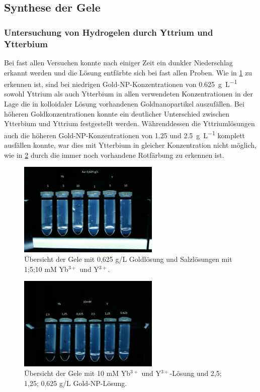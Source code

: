 	
	
	

\subsection{Synthese der Gele}
	
	\subsubsection{Untersuchung von Hydrogelen durch Yttrium und Ytterbium}
	
		Bei fast allen Versuchen konnte nach einiger Zeit ein dunkler Niederschlag erkannt werden und die Lösung entfärbte sich bei fast allen Proben.
		Wie in \cref{fig:0625Au-Gele} zu erkennen ist, sind bei niedrigen Gold-NP-Konzentrationen von \SI{0,625}{\gram\per\liter} sowohl Yttrium als auch Ytterbium in allen verwendeten Konzentrationen in der Lage die in kolloidaler Lösung vorhandenen Goldnanopartikel auszufällen.
		Bei höheren Goldkonzentrationen konnte ein deutlicher Unterschied zwischen Ytterbium und Yttrium festgestellt werden. 
		Währenddessen die Yttriumlösungen auch die höheren Gold-NP-Konzentrationen von \num{1,25} und \SI{2,5}{\gram\per\liter} komplett ausfällen konnte, war dies mit Ytterbium in gleicher Konzentration nicht möglich, wie in \cref{fig:1Y-Yb-Gele} durch die immer noch vorhandene Rotfärbung zu erkennen ist.
		
		\begin{figure}[htbp]
			\centering
			\includegraphics[width=0.6\textwidth]{Bilder/0625Au-Gele} 	
			\caption{Übersicht der Gele mit 0,625 g/L Goldlösung und Salzlösungen mit 1;5;10 mM Yb$^{3+}$ und Y$^{3+}$.}
			\label{fig:0625Au-Gele}
		\end{figure}
	
		\begin{figure}[htbp]
			\centering
			\includegraphics[width=0.6\textwidth]{Bilder/1Y-Yb-Gele} 	
			\caption{Übersicht der Gele mit 10 mM Yb$^{3+}$ und Y$^{3+}$-Lösung und 2,5; 1,25; 0,625 g/L Gold-NP-Lösung.}
			\label{fig:1Y-Yb-Gele}
		\end{figure}
		
